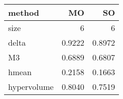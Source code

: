\begin{tabular}{l r r}
  method &      MO &      SO\\\hline
    size &  6      &  6     \\
   delta &  0.9222 &  0.8972\\
      M3 &  0.6889 &  0.6807\\
   hmean &  0.2158 &  0.1663\\
hypervolume &  0.8040 &  0.7519\\
\end{tabular}
